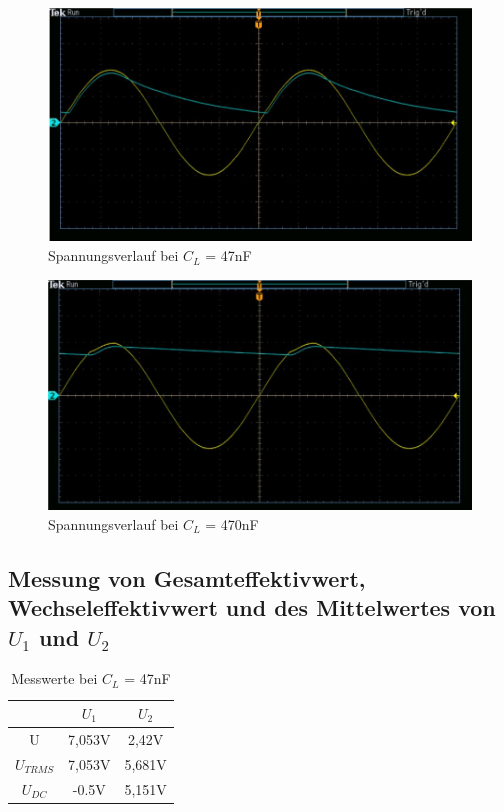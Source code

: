 \documentclass{article}
\begin{document}
\begin{figure}[h]
  \begin{center}
    \includegraphics[scale=0.6]{../assets/images/EL1P2/aufgabe 3 47n.JPG}
    \caption{Spannungsverlauf bei $C_L$ = 47nF}
  \end{center}
\end{figure}

\begin{figure}[h]
  \begin{center}
    \includegraphics[scale=0.6]{../assets/images/EL1P2/aufgabe 3 470n.JPG}
    \caption{Spannungsverlauf bei $C_L$ = 470nF}
  \end{center}
\end{figure}

\newpage

\subsection{Messung von Gesamteffektivwert, Wechseleffektivwert und des Mittelwertes von $U_1$ und $U_2$}

\begin{table}[h]
  \begin{center}
\begin{tabular}{|c|c|c|}
  \hline
  & $U_{1}$ & $U_{2}$  \\
  \hline
  U\raisebox{-0.9ex}{\~{}} & 7,053V & 2,42V\\
  \hline
  $U_{TRMS}$ & 7,053V&5,681V\\
  \hline
  $U_{DC}$ & -0.5V&5,151V\\
  \hline
\end{tabular}
\caption{Messwerte bei $C_L$ = 47nF}
\end{center}
\end{table}
\end{document}
